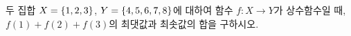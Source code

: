 두 집합 $X=\{1{,}\mkern3mu\mathopen{}2{,}\mkern3mu\mathopen{}3\}$, $Y=\{4{,}\mkern3mu\mathopen{}5{,}\mkern3mu\mathopen{}6{,}\mkern3mu\mathopen{}7{,}\mkern3mu\mathopen{}8\}$에 대하여 함수 $f:X\longrightarrow Y$가 상수함수일 때, $f(1)+f(2)+f(3)$의 최댓값과 최솟값의 합을 구하시오.
